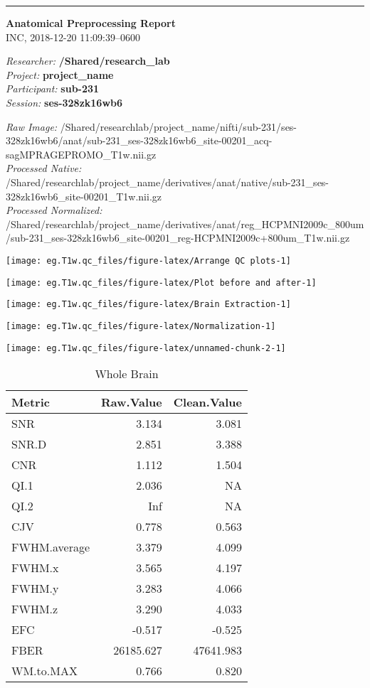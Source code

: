 \documentclass[]{article}
\title{}
\author{}
\date{}
\begin{document}
\begin{center}\rule{0.5\linewidth}{\linethickness}\end{center}

\textbf{Anatomical Preprocessing Report}\\
INC, 2018-12-20 11:09:39--0600

\emph{Researcher:} \textbf{/Shared/research\_lab}\\
\emph{Project:} \textbf{project\_name}\\
\emph{Participant:} \textbf{sub-231}\\
\emph{Session:} \textbf{ses-328zk16wb6}

 \emph{Raw Image:}
/Shared/researchlab/project\_name/nifti/sub-231/ses-328zk16wb6/anat/sub-231\_ses-328zk16wb6\_site-00201\_acq-sagMPRAGEPROMO\_T1w.nii.gz\\
 \emph{Processed Native:}
/Shared/researchlab/project\_name/derivatives/anat/native/sub-231\_ses-328zk16wb6\_site-00201\_T1w.nii.gz\\
 \emph{Processed Normalized:}
/Shared/researchlab/project\_name/derivatives/anat/reg\_HCPMNI2009c\_800um/sub-231\_ses-328zk16wb6\_site-00201\_reg-HCPMNI2009c+800um\_T1w.nii.gz

\texttt{[image: eg.T1w.qc\_files/figure-latex/Arrange QC plots-1]}

\texttt{[image: eg.T1w.qc\_files/figure-latex/Plot before and after-1]}

\texttt{[image: eg.T1w.qc\_files/figure-latex/Brain Extraction-1]}

\texttt{[image: eg.T1w.qc\_files/figure-latex/Normalization-1]}

\texttt{[image: eg.T1w.qc\_files/figure-latex/unnamed-chunk-2-1]}

\begin{wraptable}{l}{0pt}

\caption{\label{tab:unnamed-chunk-3}Whole Brain}
\centering
\fontsize{10}{12}\selectfont
\begin{tabular}[t]{l|r|r}
\hline
Metric & Raw.Value & Clean.Value\\
\hline
SNR & 3.134 & 3.081\\
\hline
SNR.D & 2.851 & 3.388\\
\hline
CNR & 1.112 & 1.504\\
\hline
QI.1 & 2.036 & NA\\
\hline
QI.2 & Inf & NA\\
\hline
CJV & 0.778 & 0.563\\
\hline
FWHM.average & 3.379 & 4.099\\
\hline
FWHM.x & 3.565 & 4.197\\
\hline
FWHM.y & 3.283 & 4.066\\
\hline
FWHM.z & 3.290 & 4.033\\
\hline
EFC & -0.517 & -0.525\\
\hline
FBER & 26185.627 & 47641.983\\
\hline
WM.to.MAX & 0.766 & 0.820\\
\hline
\end{tabular}
\end{wraptable}
\end{document}
